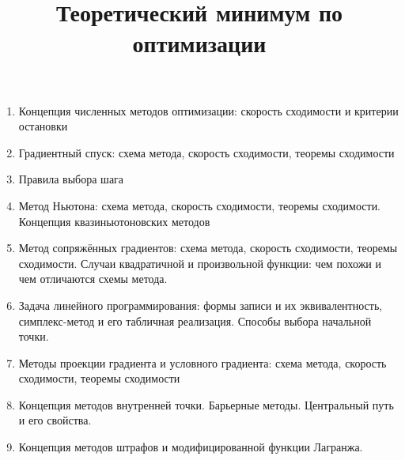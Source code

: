 \documentclass[12pt]{article}
\begin{document}
\title{Теоретический минимум по оптимизации}
\author{}
\date{}

\maketitle
\thispagestyle{empty}
\vspace{-2cm}
\begin{enumerate}
\item Концепция численных методов оптимизации: скорость сходимости и критерии остановки
\item Градиентный спуск: схема метода, скорость сходимости, теоремы сходимости
\item Правила выбора шага
\item Метод Ньютона: схема метода, скорость сходимости, теоремы сходимости. Концепция квазиньютоновских методов
\item Метод сопряжённых градиентов: схема метода, скорость сходимости, теоремы сходимости. Случаи квадратичной и произвольной функции: чем похожи и чем отличаются схемы метода.
\item Задача линейного программирования: формы записи и их эквивалентность, симплекс-метод и его табличная реализация. Способы выбора начальной точки.
\item Методы проекции градиента и условного градиента: схема метода, скорость сходимости, теоремы сходимости
\item Концепция методов внутренней точки. Барьерные методы. Центральный путь и его свойства. 
\item Концепция методов штрафов и модифицированной функции Лагранжа.


\end{enumerate}
\end{document}

